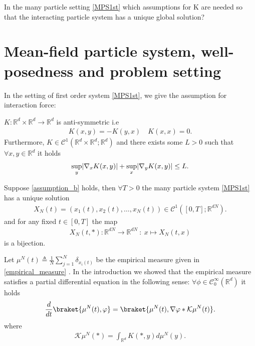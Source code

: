 \begin{exercise}
	In the many particle setting \autoref{MPS1st} which assumptions for K are needed so that the
interacting particle system has a unique global solution?
\end{exercise}
\newpage
\section{Mean-field particle system, well-posedness and problem setting}
In the setting of first order system \autoref{MPS1st}, we give the assumption for interaction force: 
\begin{assumption}\label{assumption_b}
  $K : \mathbb{R}^d\times\mathbb{R}^d \to \mathbb{R}^{d}  $ is anti-symmetric i.e
 \begin{align*}
 K(x,y) = -K(y,x) \quad K(x,x) = 0
 .\end{align*} 
 Furthermore, $K \in  \mathcal{C}^{1}(\mathbb{R}^{d} \times \mathbb{R}^{d} ; \mathbb{R}^{d}   ) $ and there exists some $L>0$ such that
  $\forall x,y \in \mathbb{R}^{d} $ it holds 
  \begin{align*}
    \sup_y \lvert\nabla_x K(x,y)\rvert + \sup_x \lvert\nabla_yK(x,y)\rvert \le L
  .\end{align*}
\end{assumption}
\begin{lemma}
  Suppose \autoref{assumption_b} holds, then $\forall T>0$ the many particle system \autoref{MPS1st} has a unique solution 
  \begin{align*}
    X_N(t) = (x_{1}(t),x_{2}(t),\ldots ,x_{N}(t)) \in  \mathcal{C}^{1} ([0,T];\mathbb{R}^{dN} )
  .\end{align*}
  and for any fixed $t \in  [0,T]$ the map
  \begin{align*}
    X_N(t,*): \mathbb{R}^{dN} \to \mathbb{R}^{dN}  \ :\ x \mapsto X_N(t,x)
  \end{align*}
  is a bijection.
\end{lemma}

\vskip5mm

Let $\mu ^{N }(t) \triangleq \frac{1}{N}  \sum_{j=1}^{N} \delta_{x_i(t)}$ be the empirical measure given in \autoref{empirical_measure} .
In the introduction we showed that the empirical measure satisfies a partial differential equation in the following sense: $\forall \phi  \in \mathcal{C}_0^{\infty}(\mathbb{R}^{d} ) $  it holds
\begin{align*}
  \frac{d}{dt} \braket{\mu^N(t),\phi } = \braket{\mu^N(t),\nabla \phi *\mathcal{K}\mu ^{N}(t) }
.\end{align*}
where 
\begin{align*}
  \mathcal{K}\mu ^{N}(*) = \int_{\mathbb{R}^{d} }  K(*,y) d\mu ^{N}(y) 
.\end{align*}

